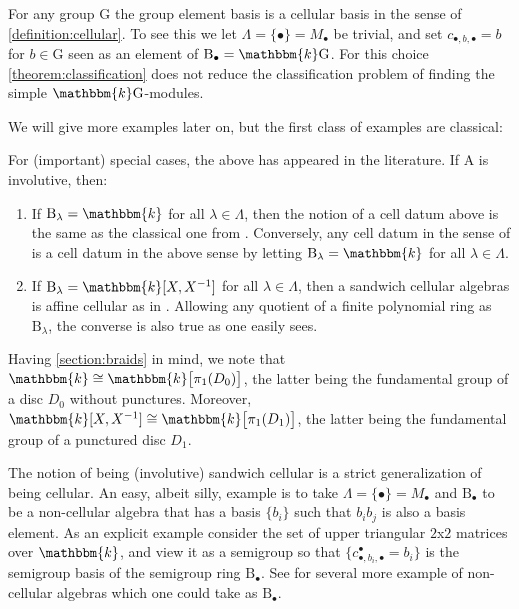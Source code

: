 \documentclass[a4paper,11pt]{amsart}
\newcommand{\setstuff}[1]{\mathrm{#1}}
\newcommand{\KK}{\mathbbm{k}}
\numberwithin{equation}{section}
\let\fullref\autoref
\begin{document}
\begin{example}\label{example:groups}
For any group $\setstuff{G}$ the group element basis 
is a cellular basis in the sense of \fullref{definition:cellular}. 
To see this we let $\Lambda=\{\bullet\}=M_{\bullet}$ be trivial,
and set $c_{\bullet,b,\bullet}=b$ for $b\in\setstuff{G}$
seen as an element of $\setstuff{B}_{\bullet}=\KK\setstuff{G}$.
For this choice \fullref{theorem:classification} 
does not reduce the classification 
problem of finding the simple $\KK\setstuff{G}$-modules.
\end{example}

We will give more examples later on, but
the first class of examples are classical:

\begin{example}
For (important) special cases, the above has appeared in the literature. 
If $\setstuff{A}$ is involutive, then:
\begin{enumerate}

\item If $\setstuff{B}_{\lambda}=\KK$ for all $\lambda\in\Lambda$, 
then the notion of a cell datum above is the same as 
the classical one from \cite{GrLe-cellular}. Conversely, any cell datum in 
the sense of \cite{GrLe-cellular} is a cell datum in the above sense 
by letting $\setstuff{B}_{\lambda}=\KK$ for all $\lambda\in\Lambda$.

\item If $\setstuff{B}_{\lambda}=\KK[X,X^{-1}]$ 
for all $\lambda\in\Lambda$, 
then a sandwich cellular algebras is affine cellular 
as in \cite{KoXi-affine-cellular}. Allowing 
any quotient of a finite polynomial ring as $\setstuff{B}_{\lambda}$, 
the converse is also true as one easily sees.

\end{enumerate}
\end{example}

\begin{remark}
Having \fullref{section:braids} in mind,
we note that $\KK\cong\KK\big[\pi_{1}(D_{0})\big]$, the latter being 
the fundamental group of a disc 
$D_{0}$ without punctures.
Moreover, $\KK[X,X^{-1}]\cong\KK\big[\pi_{1}(D_{1})\big]$, the latter 
being the fundamental group of a punctured disc $D_{1}$.
\end{remark}

\begin{example}
The notion of being (involutive) sandwich cellular 
is a strict generalization of 
being cellular. An easy, albeit silly, example is to take 
$\Lambda=\{\bullet\}=M_{\bullet}$ and $\setstuff{B}_{\bullet}$
to be a non-cellular algebra
that has a basis $\{b_{i}\}$ such that $b_{i}b_{j}$ is 
also a basis element. As an explicit example 
consider the set of upper triangular 
$2$x$2$ matrices over $\KK$, and view it as a semigroup 
so that $\{c_{\bullet,b_{i},\bullet}^{\bullet}=b_{i}\}$ 
is the semigroup basis of the semigroup ring 
$\setstuff{B}_{\bullet}$.
See \cite{EhTu-relcell} for several more example of non-cellular algebras
which one could take as $\setstuff{B}_{\bullet}$.
\end{example}
\end{document}
